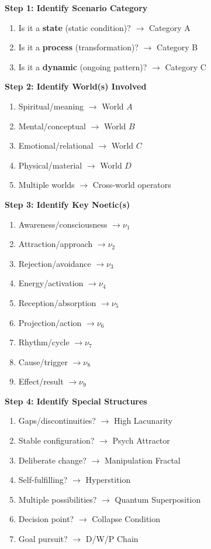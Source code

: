 \documentclass[11pt,twoside]{book}
\newcommand{\noe}[1]{\nu_{#1}}
\begin{document}
\begin{tcolorbox}[colback=blue!5!white,colframe=blue!75!black,title=\textbf{Decision Algorithm},breakable]
\textbf{Step 1: Identify Scenario Category}
\begin{enumerate}
    \item Is it a \textbf{state} (static condition)? $\to$ Category A
    \item Is it a \textbf{process} (transformation)? $\to$ Category B
    \item Is it a \textbf{dynamic} (ongoing pattern)? $\to$ Category C
\end{enumerate}

\textbf{Step 2: Identify World(s) Involved}
\begin{enumerate}
    \item Spiritual/meaning $\to$ World $A$
    \item Mental/conceptual $\to$ World $B$
    \item Emotional/relational $\to$ World $C$
    \item Physical/material $\to$ World $D$
    \item Multiple worlds $\to$ Cross-world operators
\end{enumerate}

\textbf{Step 3: Identify Key Noetic(s)}
\begin{enumerate}
    \item Awareness/consciousness $\to \noe{1}$
    \item Attraction/approach $\to \noe{2}$
    \item Rejection/avoidance $\to \noe{3}$
    \item Energy/activation $\to \noe{4}$
    \item Reception/absorption $\to \noe{5}$
    \item Projection/action $\to \noe{6}$
    \item Rhythm/cycle $\to \noe{7}$
    \item Cause/trigger $\to \noe{8}$
    \item Effect/result $\to \noe{9}$
\end{enumerate}

\textbf{Step 4: Identify Special Structures}
\begin{enumerate}
    \item Gaps/discontinuities? $\to$ High Lacunarity
    \item Stable configuration? $\to$ Psych Attractor
    \item Deliberate change? $\to$ Manipulation Fractal
    \item Self-fulfilling? $\to$ Hyperstition
    \item Multiple possibilities? $\to$ Quantum Superposition
    \item Decision point? $\to$ Collapse Condition
    \item Goal pursuit? $\to$ D/W/P Chain
\end{enumerate}


\end{tcolorbox}
\end{document}
